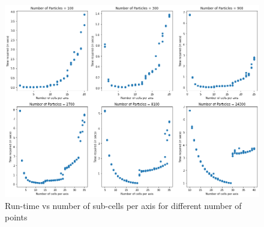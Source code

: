 \documentclass[twocolumn,11pt]{article}
\begin{document}
\newpage
\onecolumn
\begin{figure}[h]
\centering
	\includegraphics[width=\linewidth]{gridperaxis}
	\caption{\small{Run-time vs number of sub-cells per axis for different number of points}}
	\label{fig8}
\end{figure}
\end{document}
